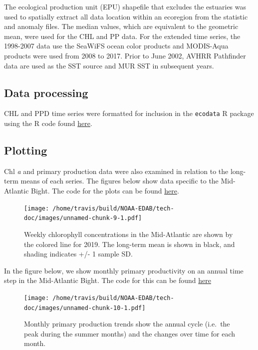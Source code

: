 \documentclass[
]{book}
\begin{document}
The ecological production unit (EPU) shapefile that excludes the estuaries was used to spatially extract all data location within an ecoregion from the statistic and anomaly files. The median values, which are equivalent to the geometric mean, were used for the CHL and PP data. For the extended time series, the 1998-2007 data use the SeaWiFS ocean color products and MODIS-Aqua products were used from 2008 to 2017. Prior to June 2002, AVHRR Pathfinder data are used as the SST source and MUR SST in subsequent years.

\hypertarget{data-processing-6}{%
\subsection{Data processing}\label{data-processing-6}}

CHL and PPD time series were formatted for inclusion in the \texttt{ecodata} R package using the R code found \href{https://github.com/NOAA-EDAB/ecodata/blob/master/data-raw/get_chl_pp.R}{here}.

\hypertarget{plotting-5}{%
\subsection{Plotting}\label{plotting-5}}

Chl \emph{a} and primary production data were also examined in relation to the long-term means of each series. The figures below show data specific to the Mid-Atlantic Bight. The code for the plots can be found \href{https://github.com/NOAA-EDAB/ecodata/blob/master/chunk-scripts/LTL.Rmd-mab-chl-weekly.R}{here}.

\begin{figure}
\centering
\texttt{[image: /home/travis/build/NOAA-EDAB/tech-doc/images/unnamed-chunk-9-1.pdf]}
\caption{\label{fig:unnamed-chunk-9}Weekly chlorophyll concentrations in the Mid-Atlantic are shown by the colored line for 2019. The long-term mean is shown in black, and shading indicates +/- 1 sample SD.}
\end{figure}

In the figure below, we show monthly primary productivity on an annual time step in the Mid-Atlantic Bight. The code for this can be found \href{https://github.com/NOAA-EDAB/ecodata/blob/master/chunk-scripts/LTL.Rmd-PP-OCCI.R}{here}

\begin{figure}
\centering
\texttt{[image: /home/travis/build/NOAA-EDAB/tech-doc/images/unnamed-chunk-10-1.pdf]}
\caption{\label{fig:unnamed-chunk-10}Monthly primary production trends show the annual cycle (i.e.~the peak during the summer months) and the changes over time for each month.}
\end{figure}
\end{document}
